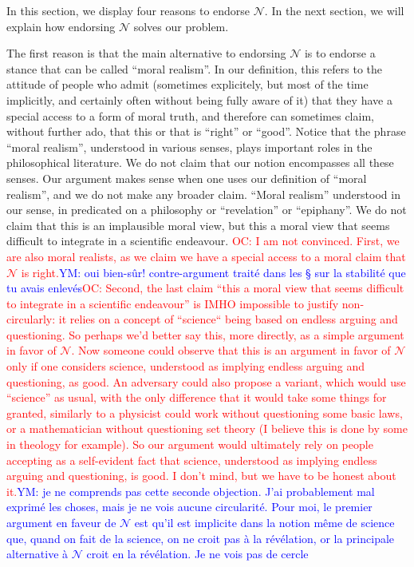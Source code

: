 \documentclass[preprint, french, english, 11pt, authoryear]{elsarticle}%
\newcommand{\commentYM}[1]{\textcolor{blue}{YM: #1}}
\newcommand{\commentOC}[1]{\textcolor{red}{OC: #1}}
\newcommand{\adv}{\mathscr{N}}
\begin{document}
In this section, we display four reasons to endorse $\adv$. In the next section, we will explain how endorsing $\adv$ solves our problem.

The first reason is that the main alternative to endorsing $\adv$ is to endorse a stance that can be called ``moral realism''. In our definition, this refers to the attitude of people who admit (sometimes explicitely, but most of the time implicitly, and certainly often without being fully aware of it) that they have a special access to a form of moral truth, and therefore can sometimes claim, without further ado, that this or that is ``right'' or ``good''. Notice that the phrase ``moral realism'', understood in various senses, plays important roles in the philosophical literature. We do not claim that our notion encompasses all these senses. Our argument makes sense when one uses our definition of ``moral realism'', and we do not make any broader claim. ``Moral realism'' understood in our sense, in predicated on a philosophy or ``revelation'' or ``epiphany''. We do not claim that this is an implausible moral view, but this a moral view that seems difficult to integrate in a scientific endeavour. \commentOC{I am not convinced. First, we are also moral realists, as we claim we have a special access to a moral claim that $\adv$ is right.}\commentYM{oui bien-sûr! contre-argument traité dans les § sur la stabilité que tu avais enlevés}\commentOC{ Second, the last claim “this a moral view that seems difficult to integrate in a scientific endeavour” is IMHO impossible to justify non-circularly: it relies on a concept of “science“ being based on endless arguing and questioning. So perhaps we’d better say this, more directly, as a simple argument in favor of $\adv$. Now someone could observe that this is an argument in favor of $\adv$ only if one considers science, understood as implying endless arguing and questioning, as good. An adversary could also propose a variant, which would use “science” as usual, with the only difference that it would take some things for granted, similarly to a physicist could work without questioning some basic laws, or a mathematician without questioning set theory (I believe this is done by some in theology for example). So our argument would ultimately rely on people accepting as a self-evident fact that science, understood as implying endless arguing and questioning, is good. I don’t mind, but we have to be honest about it.}\commentYM{je ne comprends pas cette seconde objection. J'ai probablement mal exprimé les choses, mais je ne vois aucune circularité. Pour moi, le premier argument en faveur de $\adv$ est qu'il est implicite dans la notion même de science que, quand on fait de la science, on ne croit pas à la révélation, or la principale alternative à $\adv$ croit en la révélation. Je ne vois pas de cercle}
\end{document}

